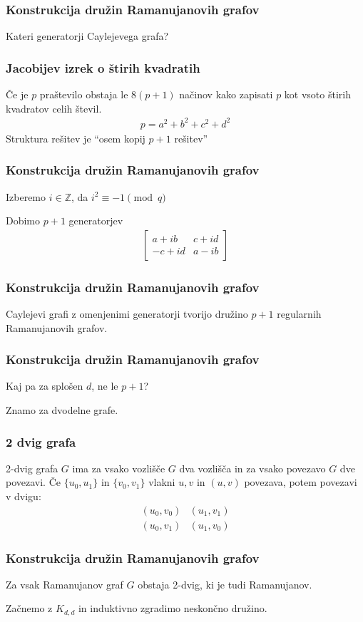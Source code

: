 \documentclass{beamer}
\begin{document}
\begin{frame}
    \frametitle{Konstrukcija družin Ramanujanovih grafov}
    Kateri generatorji Caylejevega grafa?
\end{frame}
\begin{frame}
    \frametitle{Jacobijev izrek o štirih kvadratih}
    Če je \(p\) praštevilo obstaja le \(8(p+1)\) načinov kako zapisati \(p\) kot vsoto štirih kvadratov celih števil.
    \begin{align*}
        p = a^2 + b^2 + c^2 + d^2
    \end{align*}\pause
    Struktura rešitev je ``osem kopij \(p+1\) rešitev''
\end{frame}
\begin{frame}
\frametitle{Konstrukcija družin Ramanujanovih grafov}
Izberemo \(i\in\mathbb Z\), da \(i^2 \equiv -1\pmod{q}\)

Dobimo \(p+1\) generatorjev
\begin{align*}
    \begin{bmatrix}
        a + ib  & c+id \\
        -c + id & a-ib
    \end{bmatrix}
\end{align*}
\end{frame}
\begin{frame}
    \frametitle{Konstrukcija družin Ramanujanovih grafov}
    Caylejevi grafi z omenjenimi generatorji tvorijo družino \(p+1\) regularnih Ramanujanovih grafov.
\end{frame}
\begin{frame}
    \frametitle{Konstrukcija družin Ramanujanovih grafov}
    Kaj pa za splošen \(d\), ne le \(p+1\)?\pause

    Znamo za dvodelne grafe.
\end{frame}
\begin{frame}
    \frametitle{2 dvig grafa}
    2-dvig grafa \(G\) ima za vsako vozlišče \(G\) dva vozlišča in za vsako povezavo \(G\) dve povezavi.\pause 
    Če \(\{u_0, u_1\}\) in \(\{v_0, v_1\}\) vlakni \(u, v\) in \((u,v)\) povezava, potem povezavi v dvigu:
    \begin{align*}
        (u_0, v_0) &(u_1, v_1) \\
        (u_0, v_1) &(u_1, v_0)
    \end{align*}
\end{frame}
\begin{frame}
    \frametitle{Konstrukcija družin Ramanujanovih grafov}
    Za vsak Ramanujanov graf \(G\) obstaja 2-dvig, ki je tudi Ramanujanov.\pause

    Začnemo z \(K_{d,d}\) in induktivno zgradimo neskončno družino.
\end{frame}
\end{document}
